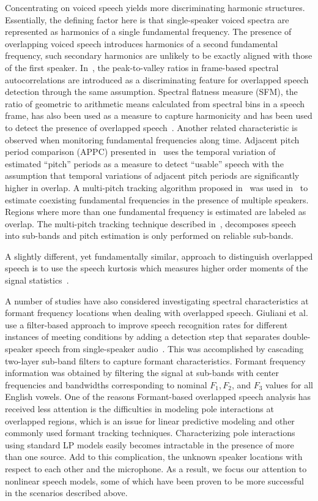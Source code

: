 Concentrating on voiced speech yields more discriminating harmonic structures. 
Essentially, the defining factor here is that single-speaker voiced spectra are represented as harmonics of a single fundamental frequency. 
The presence of overlapping voiced speech introduces harmonics of a second fundamental frequency, such secondary harmonics are unlikely to be exactly aligned with those of the first speaker. 
In~\cite{sapvr_2000}, the peak-to-valley ratios in frame-based spectral autocorrelations are introduced as a discriminating feature for overlapped speech detection through the same assumption. 
Spectral flatness measure (SFM), the ratio of geometric to arithmetic means calculated from spectral bins in a speech frame, has also been used as a measure to capture harmonicity and has been used to detect the presence of overlapped speech~\cite{nav_icassp13}. 
Another related characteristic is observed when monitoring fundamental frequencies along time. 
Adjacent pitch period comparison (APPC) presented in~\cite{appc2001} uses the temporal variation of estimated ``pitch'' periods as a measure to detect ``usable'' speech with the assumption that temporal variations of adjacent pitch periods are significantly higher in overlap. 
A multi-pitch tracking algorithm proposed in~\cite{Dwang_03_trans} was used in~\cite{Dwang_03} to estimate coexisting fundamental frequencies in the presence of multiple speakers. 
Regions where more than one fundamental frequency is estimated are labeled as overlap. 
The multi-pitch tracking technique described in~\cite{Dwang_03_trans}, decomposes speech into sub-bands and pitch estimation is only performed on reliable sub-bands. 

A slightly different, yet fundamentally similar, approach to distinguish overlapped speech is to use the speech kurtosis which measures higher order moments of the signal statistics~\cite{Wrigley_05}. 


A number of studies have also considered investigating spectral characteristics at formant frequency locations when dealing with overlapped speech. 
Giuliani et al. use a filter-based approach to improve speech recognition rates for different instances of meeting conditions by adding a detection step that separates double-speaker speech from single-speaker audio~\cite{giuliani_meeting}. 
This was accomplished by cascading two-layer sub-band filters to capture formant characteristics. 
Formant frequency information was obtained by filtering the signal at sub-bands with center frequencies and bandwidths corresponding to nominal ${F_1, F_2}$, and ${F_3}$ values for all English vowels. 
One of the reasons Formant-based overlapped speech analysis has received less attention is the difficulties in modeling pole interactions at overlapped regions, which is an issue for linear predictive modeling and other commonly used formant tracking techniques. 
Characterizing pole interactions using standard LP models easily becomes intractable in the presence of more than one source. 
Add to this complication, the unknown speaker locations with respect to each other and the microphone. 
As a result, we focus our attention to nonlinear speech models, some of which have been proven to be more successful in the scenarios described above. 

